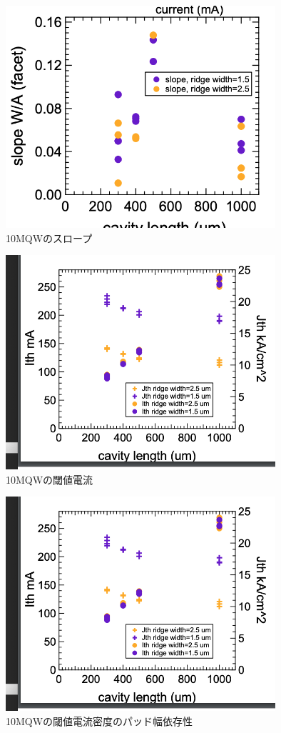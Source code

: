 \begin{figure}[h]
	\centering
	\includegraphics[width=10cm]{figure/fig_3_1_broad_slope_10QW.png}
		\caption{10MQWのスロープ}
		\label{fig_3_1_IL_broad_slope}
\end{figure}

\begin{figure}[h]
	\centering
	\includegraphics[width=10cm]{figure/fig_3_1_broad_i_th_10QW.png}
		\caption{10MQWの閾値電流}
		\label{fig_3_1_broad_i_th_3QW}
\end{figure}


\begin{figure}[h]
	\centering
	\includegraphics[width=10cm]{figure/fig_3_1_broad_i_th_10QW.png}
		\caption{10MQWの閾値電流密度のパッド幅依存性}
		\label{fig_3_1_broad_j_th_10QW}
\end{figure}
